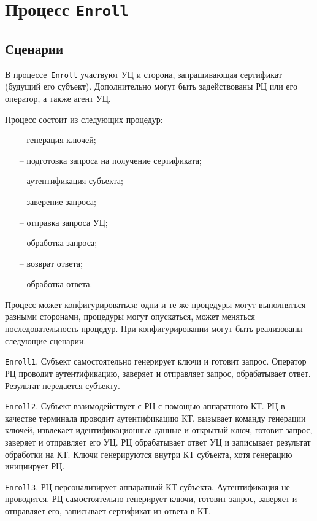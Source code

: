 \section{Процесс \texttt{Enroll}}\label{PROCESSES.Enroll}

\subsection{Сценарии}\label{PROCESSES.Enroll.List}

В процессе~\texttt{Enroll} участвуют УЦ и сторона, запрашивающая 
сертификат (будущий его субъект). Дополнительно могут быть задействованы
РЦ или его оператор, а также агент УЦ. 

Процесс состоит из следующих процедур:
\begin{itemize}
\item[--]
генерация ключей;
\item[--]
подготовка запроса на получение сертификата;
\item[--]
аутентификация субъекта;
\item[--]
заверение запроса;
\item[--]
отправка запроса УЦ;
\item[--]
обработка запроса;
\item[--]
возврат ответа;
\item[--]
обработка ответа.
\end{itemize}

Процесс может конфигурироваться: 
одни и те же процедуры могут выполняться разными сторонами,
процедуры могут опускаться, может меняться последовательность 
процедур. При конфигурировании могут быть реализованы следующие сценарии.

\texttt{Enroll1}. 
Субъект самостоятельно генерирует ключи и готовит запрос.
Оператор РЦ проводит аутентификацию, заверяет и отправляет запрос, 
обрабатывает ответ. Результат передается субъекту.

\texttt{Enroll2}. 
Субъект взаимодействует с РЦ с помощью аппаратного КТ. РЦ в качестве 
терминала проводит аутентификацию КТ, вызывает команду генерации ключей,
извлекает идентификационные данные и открытый ключ, готовит запрос, 
заверяет и отправляет его УЦ. РЦ обрабатывает ответ УЦ и записывает 
результат обработки на КТ. Ключи генерируются внутри КТ субъекта,
хотя генерацию инициирует РЦ.

\texttt{Enroll3}. 
РЦ персонализирует аппаратный КТ субъекта. 
Аутентификация не проводится. РЦ самостоятельно генерирует ключи,
готовит запрос, заверяет и отправляет его, записывает сертификат из ответа 
в КТ.

